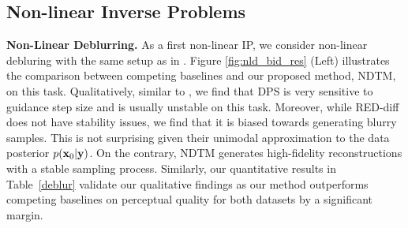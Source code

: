 \subsection{Non-linear Inverse Problems}
\textbf{Non-Linear Deblurring.} 
As a first non-linear IP, we consider non-linear debluring with the same setup as in \citet{chung2022diffusion}. Figure \ref{fig:nld_bid_res} (Left) illustrates the comparison between competing baselines and our proposed method, NDTM, on this task. Qualitatively, similar to \citet{mardani2023variational}, we find that DPS is very sensitive to guidance step size and is usually unstable on this task. Moreover, while RED-diff does not have stability issues, we find that it is biased towards generating blurry samples. This is not surprising given their unimodal approximation to the data posterior $p({\mathbf{x}}_0|{\mathbf{y}})$. On the contrary, NDTM generates high-fidelity reconstructions with a stable sampling process. Similarly, our quantitative results in Table~\ref{deblur} validate our qualitative findings as our method outperforms competing baselines on perceptual quality for both datasets by a significant margin.

    

\begin{table}[t]
\centering
\caption{Comparisons on \textbf{noisy Non-linear Deblur}. NDTM outperforms competing baselines by a significant margin. \textbf{Bold}: best.}
\setlength{\tabcolsep}{4pt}
\label{deblur}
\end{table}

